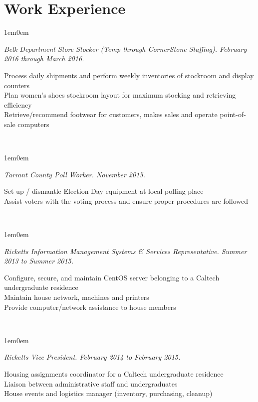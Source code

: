 \documentclass[10pt,letterpaper, full]{article}
\newcommand{\pjtitle}[1]{\renewcommand{\givenpjtitle}{#1}}
\newcommand{\pjtime}[1]{\renewcommand{\givenpjtime}{#1}}
\newcommand{\pjbody}[1]{\renewcommand{\givenpjbody}{#1}}
\newcommand{\givenpjtitle}{REQUIRED!}
\newcommand{\givenpjtime}{REQUIRED!}
\newcommand{\givenpjbody}{REQUIRED!}
\newenvironment{projectenv}
    {
        \begin{adjustwidth}{1em}{0em}
    }
    {
        \textit{\givenpjtitle. \givenpjtime.}

        \begin{minipage}[l]{\textwidth}
            \givenpjbody%
        \end{minipage}\\%


        \end{adjustwidth}
    }
\begin{document}
\section{Work Experience}
\begin{projectenv}%
    \pjtitle{Belk Department Store Stocker (Temp through CornerStone Staffing)}
    \pjtime{February 2016 through March 2016}
    \pjbody{
        Process daily shipments and perform weekly inventories of stockroom and display counters\\
        Plan women's shoes stockroom layout for maximum stocking and retrieving efficiency\\
        Retrieve/recommend footwear for customers, makes sales and operate point-of-sale computers\\
    }
\end{projectenv}%

\begin{projectenv}%
    \pjtitle{Tarrant County Poll Worker}
    \pjtime{November 2015}
    \pjbody{
        Set up / dismantle Election Day equipment at local polling place\\
        Assist voters with the voting process and ensure proper procedures are followed\\
    }
\end{projectenv}%

\newpage

\begin{projectenv}%
    \pjtitle{Ricketts Information Management Systems \& Services Representative}
    \pjtime{Summer 2013 to Summer 2015}
    \pjbody{
        Configure, secure, and maintain CentOS server belonging to a Caltech
        undergraduate residence\\
        Maintain house network, machines and printers\\
        Provide computer/network assistance to house members\\
    }
\end{projectenv}%

\begin{projectenv}%
    \pjtitle{Ricketts Vice President}
    \pjtime{February 2014 to February 2015}
    \pjbody{
        Housing assignments coordinator for a Caltech undergraduate residence\\
        Liaison between administrative staff and undergraduates\\
        House events and logistics manager (inventory, purchasing, cleanup)\\
    }
\end{projectenv}%
\end{document}
